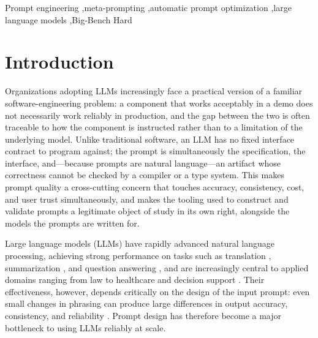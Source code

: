 \documentclass[a4paper,fleqn]{cas-sc}
\begin{document}
\begin{keywords}
Prompt engineering \sep meta-prompting \sep automatic prompt optimization \sep large language models \sep Big-Bench Hard
\end{keywords}

\maketitle

\section{Introduction}

Organizations adopting LLMs increasingly face a practical version of a familiar software-engineering problem: a component that works acceptably in a demo does not necessarily work reliably in production, and the gap between the two is often traceable to how the component is instructed rather than to a limitation of the underlying model. Unlike traditional software, an LLM has no fixed interface contract to program against; the prompt is simultaneously the specification, the interface, and---because prompts are natural language---an artifact whose correctness cannot be checked by a compiler or a type system. This makes prompt quality a cross-cutting concern that touches accuracy, consistency, cost, and user trust simultaneously, and makes the tooling used to construct and validate prompts a legitimate object of study in its own right, alongside the models the prompts are written for.

Large language models (LLMs) have rapidly advanced natural language processing, achieving strong performance on tasks such as translation \citep{goyal2023}, summarization \citep{qin2025}, and question answering \citep{zhang2023}, and are increasingly central to applied domains ranging from law to healthcare and decision support \citep{colombo2024,zhang2025}. Their effectiveness, however, depends critically on the design of the input prompt: even small changes in phrasing can produce large differences in output accuracy, consistency, and reliability \citep{errica2025}. Prompt design has therefore become a major bottleneck to using LLMs reliably at scale.
\end{document}
